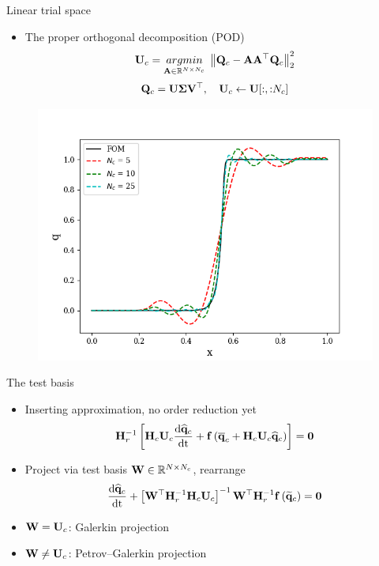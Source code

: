 \documentclass[]{beamer}
\begin{document}
\begin{frame}{Linear trial space}
    \begin{itemize}
        \item The proper orthogonal decomposition (POD)\footnotemark[1]
        \begin{equation*}
            \consTrial = \argmin{\dummyMatOne \in \mathbb{R}^{\numDOF \times \numConsModes}} \norm{\consDataMat - \dummyMatOne \dummyMatOne^\top \consDataMat}_2^2
        \end{equation*}
        \begin{equation*}
            \consDataMat = \basisMat \singVecMat \rightSingVecMat^\top, \quad \consTrial \leftarrow \basisMat[:, {:}\numConsModes]
        \end{equation*}
    \end{itemize}
	\centering
	\vspace{-0.8em}
	\begin{figure}
		\includegraphics[width=0.5\linewidth]{theory/podProfileConverge.png}
	\end{figure}
\end{frame}

\begin{frame}{The test basis}
    \begin{itemize}
        \item Inserting approximation, no order reduction yet
        \begin{equation*}
            \resScaleInv \left[\consScale \consTrial \ode{\consVecCoef}{\timeVar} + \rhsFunc{\consVecCent + \consScale \consTrial \consVecCoef}\right] = \zeroVec 
        \end{equation*}
        \item Project via test basis $\testBasis \in \mathbb{R}^{\numDOF \times \numConsModes}$, rearrange
        \begin{equation*}
            \ode{\consVecCoef}{\timeVar} + \left[ \testBasis^\top \resScaleInv \consScale \consTrial \right]^{-1} \testBasis^\top \resScaleInv \rhsFunc{\consVecRom} = \zeroVec
        \end{equation*}
        \item $\testBasis = \consTrial$: Galerkin projection
        \item $\testBasis \neq \consTrial$: Petrov--Galerkin projection 
    \end{itemize}
\end{frame}
\end{document}
